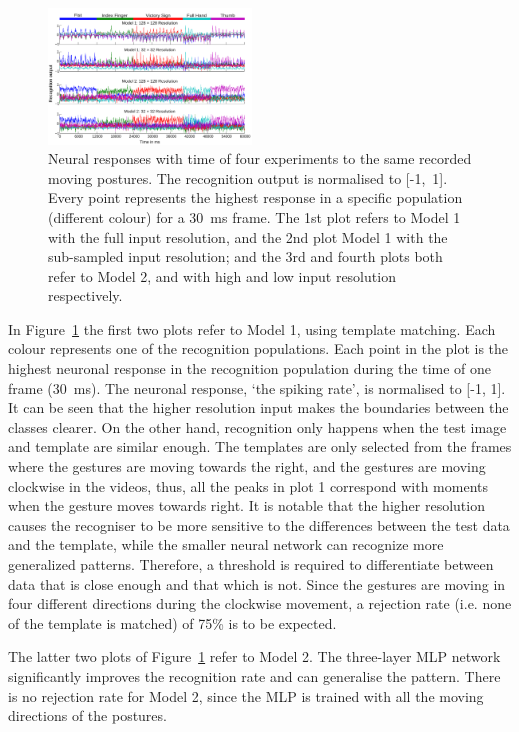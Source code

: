 \documentclass[journal]{journal}
\begin{document}
\begin{figure}
\centering
	\includegraphics[width=0.48\textwidth]{pics/rateMatlab.pdf}
	\caption{Neural responses with time of four experiments to the same recorded moving postures.
	The recognition output is normalised to \mbox{[-1, 1]}.
	Every point represents the highest response in a specific population (different colour) for a 30~ms frame.
	The 1st plot refers to Model 1 with the full input resolution, and the 2nd plot Model 1 with the sub-sampled input resolution; and the 3rd and fourth plots both refer to Model 2, and with high and low input resolution respectively. 
	}
	\label{fig:matlabrec}
\end{figure}




In Figure~\ref{fig:matlabrec} the first two plots refer to Model 1, using template matching. Each colour represents one of the recognition populations. 
Each point in the plot is the highest neuronal response in the recognition population during the time of one frame (30~ms). 
The neuronal response, `the spiking rate', is normalised to [-1, 1]. 
It can be seen that the higher resolution input makes the boundaries between the classes clearer. 
On the other hand, recognition only happens when the test image and template are similar enough. 
The templates are only selected from the frames where the gestures are moving towards the right, and the gestures are moving clockwise in the videos, thus, all the peaks in plot 1 correspond with moments when the gesture moves towards right.  
It is notable that the higher resolution causes the recogniser to be more sensitive to the differences between the test data and the template, while the smaller neural network can recognize more generalized patterns. 
Therefore, a threshold is required to differentiate between data that is close enough and that which is not. 
Since the gestures are moving in four different directions during the clockwise movement, a rejection rate (i.e. none of the template is matched) of 75\% is to be expected. 

The latter two plots of Figure~\ref{fig:matlabrec} refer to Model 2. 
The three-layer MLP network significantly improves the recognition rate and can generalise the pattern. 
There is no rejection rate for Model 2, since the MLP is trained with all the moving directions of the postures.
\end{document}
